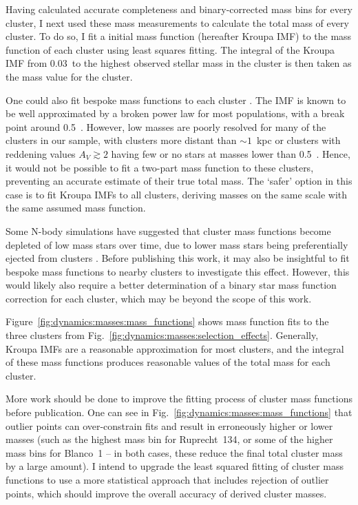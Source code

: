 Having calculated accurate completeness and binary-corrected mass bins for every cluster, I next used these mass measurements to calculate the total mass of every cluster. To do so, I fit a \cite{kroupa_variation_2001} initial mass function (hereafter Kroupa IMF) to the mass function of each cluster using least squares fitting. The integral of the Kroupa IMF from 0.03~\MSun to the highest observed stellar mass in the cluster is then taken as the mass value for the cluster.

One could also fit bespoke mass functions to each cluster \citep[e.g. as in][]{cordoni_photometric_binaries_2023}. The IMF is known to be well approximated by a broken power law for most populations, with a break point around 0.5~\MSun \citep{kroupa_variation_2001}. However, low masses are poorly resolved for many of the clusters in our sample, with clusters more distant than $\sim1$~kpc or clusters with reddening values $A_V \gtrsim 2$ having few or no stars at masses lower than 0.5~\MSun. Hence, it would not be possible to fit a two-part mass function to these clusters, preventing an accurate estimate of their true total mass. The `safer' option in this case is to fit Kroupa IMFs to all clusters, deriving masses on the same scale with the same assumed mass function.

Some N-body simulations have suggested that cluster mass functions become depleted of low mass stars over time, due to lower mass stars being preferentially ejected from clusters \citep{krause_physics_2020}. Before publishing this work, it may also be insightful to fit bespoke mass functions to nearby clusters to investigate this effect. However, this would likely also require a better determination of a binary star mass function correction for each cluster, which may be beyond the scope of this work.

Figure~\ref{fig:dynamics:masses:mass_functions} shows mass function fits to the three clusters from Fig.~\ref{fig:dynamics:masses:selection_effects}. Generally, Kroupa IMFs are a reasonable approximation for most clusters, and the integral of these mass functions produces reasonable values of the total mass for each cluster. 

More work should be done to improve the fitting process of cluster mass functions before publication. One can see in Fig.~\ref{fig:dynamics:masses:mass_functions} that outlier points can over-constrain fits and result in erroneously higher or lower masses (such as the highest mass bin for Ruprecht~134, or some of the higher mass bins for Blanco~1 -- in both cases, these reduce the final total cluster mass by a large amount). I intend to upgrade the least squared fitting of cluster mass functions to use a more statistical approach that includes rejection of outlier points, which should improve the overall accuracy of derived cluster masses.


